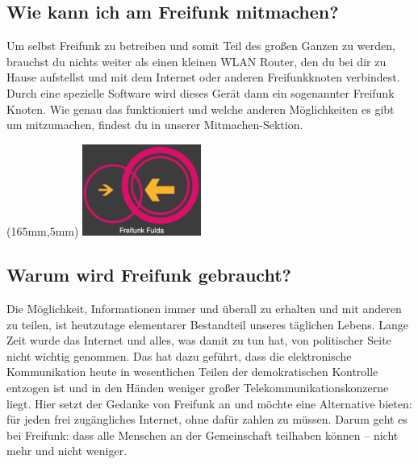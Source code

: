 \subsection{Wie kann ich am Freifunk mitmachen?}

Um selbst Freifunk zu betreiben und somit Teil des großen Ganzen zu werden, brauchst du nichts weiter als einen kleinen WLAN Router, den du bei dir zu Hause aufstellst und mit dem Internet oder anderen Freifunkknoten verbindest. Durch eine spezielle Software wird dieses Gerät dann ein sogenannter Freifunk Knoten.
Wie genau das funktioniert und welche anderen Möglichkeiten es gibt um mitzumachen, findest du in unserer Mitmachen-Sektion.

\newpage
\begin{textblock*}{30mm}(165mm,5mm)
\includegraphics[height=30mm,width=39mm]{./FFLogo.png}\\
\end{textblock*}
\subsection{Warum wird Freifunk gebraucht?}

Die Möglichkeit, Informationen immer und überall zu erhalten und mit anderen zu teilen, ist heutzutage elementarer Bestandteil unseres täglichen Lebens. Lange Zeit wurde das Internet und alles, was damit zu tun hat, von politischer Seite nicht wichtig genommen. Das hat dazu geführt, dass die elektronische Kommunikation heute in wesentlichen Teilen der demokratischen Kontrolle entzogen ist und in den Händen weniger großer Telekommunikationskonzerne liegt. Hier setzt der Gedanke von Freifunk an und möchte eine Alternative bieten: für jeden frei zugängliches Internet, ohne dafür zahlen zu müssen. Darum geht es bei Freifunk: dass alle Menschen an der Gemeinschaft teilhaben können – nicht mehr und nicht weniger.